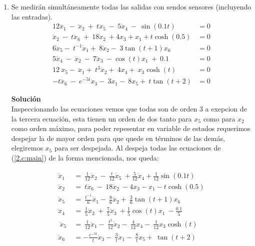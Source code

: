 \documentclass[letterpaper, 12pt]{article}
\begin{document}
\begin{enumerate}
\begin{enumerate}
\item Se medirán simultáneamente todas las salidas con sendos sensores (incluyendo las entradas).
\begin{equation}
\begin{split}
    12{\dddot{x}}_1\ -\ {\ddot{x}}_2\ +\ t{\dot{x}}_5\ -\ 5{\dot{x}}_4\ -\ \sin(0.1t) &=0 \\
    \dddot{x}_2\ -\ t\ddot{x}_6\ +\ 18\dot{x}_2\ + 4x_3 + x_1 + t \cosh(0.5) &= 0 \\
    6{\ddot{x}}_5-\ t^{-1}{\dot{x}}_1+\ 8{\ddot{x}}_2-\ 3\tan(t + 1)x_6 &= 0\\
    5{\dddot{x}}_4\ -\ {\ddot{x}}_2\ -\ 7{\ddot{x}}_3\ -\cos(t)x_1\ +\ 0.1 &= 0 \\ 
    12{\dddot{\ x}}_5-\ {\ddot{x}}_1+\ t^{3}{\dot{x}}_2+\ 4x_4+\ x_3\cosh(t) &=0 \\
    -t{\dddot{x}}_6\ -\ e^{-5t}{\ddot{x}}_3-\ 3{\dot{x}}_1-\ 8x_5+\ t\tan(t + 2) &= 0
    \label{2.c:main}
\end{split}
\end{equation}

\textbf{Solución} \\ 
Inspeccionando las ecuaciones vemos que todas son de orden 3 a exepcion de la tercera ecuación, esta tienen un orden de dos tanto para $x_5$ como para $x_2$ como orden máximo, para poder repesentar en variable de estados requerimos despejar la de mayor orden para que quede en términos de las demás, elegiremos $x_5$ para ser despejada. Al despeja todas las ecuaciones de (\ref{2.c:main}) de la forma mencionada, nos queda:

\begin{equation}
\begin{split}
    {\dddot{x}}_1\ &=\ \frac{1}{12}{\ddot{x}}_2\ -\ \frac{t}{12}{\dot{x}}_5\ +\frac{5}{12}{\dot{x}}_4+ \frac{1}{12} \sin(0.1t)  \\
    \dddot{x}_2\ &= \ t\ddot{x}_6\ -\ 18\dot{x}_2\ - 4x_3 - x_1 - t \cosh(0.5) \\
    {\ddot{x}}_5\ &=\ \frac{t^{-1}}{6}{\dot{x}}_1-\ \frac{8}{6}{\ddot{x}}_2+\ \frac{3}{6}\tan(t + 1)x_6 \\
    {\dddot{x}}_4\ &=\ \frac{1}{5}{\ddot{x}}_2\ +\ \frac{7}{5}{\ddot{x}}_3\ +\frac{1}{5}\cos(t)x_1\ -\frac{0.1}{5}  \\ 
    {\dddot{\ x}}_5\ &=\ \frac{1}{12}{\ddot{x}}_1-\ \frac{t^{3}}{12}{\dot{x}}_2-\ \frac{4}{12}x_4-\ \frac{1}{12}x_3\cosh(t)  \\
    {\dddot{x}}_6\ &= - \frac{e^{-5t}}{t} {\ddot{x}}_3-\ \frac{3}{t}{\dot{x}}_1-\ \frac{8}{t}x_5+\ \tan(t + 2) 
    \label{2.c:despejada}
\end{split}
\end{equation}


\end{enumerate}
\end{enumerate}
\end{document}
